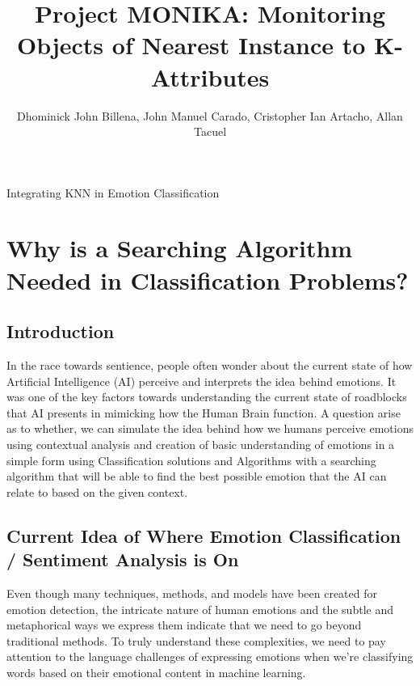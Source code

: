\documentclass[11pt]{article}
\title{Project MONIKA: Monitoring Objects of Nearest Instance to K-Attributes}
\author{Dhominick John Billena, John Manuel Carado, Cristopher Ian Artacho, Allan Tacuel}
\begin{document}
    \setlength{\parindent}{1.5cm}

    \maketitle     
    \begin{center}
        \large Integrating KNN in Emotion Classification   
    \end{center}
    \section*{Why is a Searching Algorithm Needed in Classification Problems?}
    \begin{multicols*}{2}   
    \subsection*{Introduction}
    \par In the race towards sentience, people often wonder about the current state of how Artificial Intelligence (AI) perceive and interprets the idea behind emotions. It was one of the key factors towards understanding the current state of roadblocks that AI presents in mimicking how the Human Brain function. A question arise as to whether, we can simulate the idea behind how we humans perceive emotions using contextual analysis and creation of basic understanding of emotions in a simple form using Classification solutions and Algorithms with a searching algorithm that will be able to find the best possible emotion that the AI can relate to based on the given context.\cite{sentiment_analysis}
    \subsection*{Current Idea of Where Emotion Classification / Sentiment Analysis is On}
    \par Even though many techniques, methods, and models have been created for emotion detection, the intricate nature of human emotions and the subtle and metaphorical ways we express them indicate that we need to go beyond traditional methods. To truly understand these complexities, we need to pay attention to the language challenges of expressing emotions when we’re classifying words based on their emotional content in machine learning.

\end{multicols*}
\end{document}

